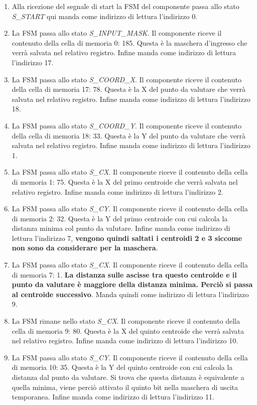 \documentclass{article}
\begin{document}
\begin{enumerate}
    \item Alla ricezione del segnale di start la FSM del componente passa allo stato \textit{S\_START} qui manda come indirizzo di lettura l'indirizzo 0.
    \item La FSM passa allo stato \textit{S\_INPUT\_MASK}. Il componente riceve il contenuto della cella di memoria 0: 185. Questa è la maschera d'ingresso che verrà salvata nel relativo registro. Infine manda come indirizzo di lettura l'indirizzo 17.
    \item La FSM passa allo stato \textit{S\_COORD\_X}. Il componente riceve il contenuto della cella di memoria 17: 78. Questa è la X del punto da valutare che verrà salvata nel relativo registro. Infine manda come indirizzo di lettura l'indirizzo 18.
    \item La FSM passa allo stato \textit{S\_COORD\_Y}. Il componente riceve il contenuto della cella di memoria 18: 33. Questa è la Y del punto da valutare che verrà salvata nel relativo registro. Infine manda come indirizzo di lettura l'indirizzo 1.
    \item La FSM passa allo stato \textit{S\_CX}. Il componente riceve il contenuto della cella di memoria 1: 75. Questa è la X del primo centroide che verrà salvata nel relativo registro. Infine manda come indirizzo di lettura l'indirizzo 2.
    \item La FSM passa allo stato \textit{S\_CY}. Il componente riceve il contenuto della cella di memoria 2: 32. Questa è la Y del primo centroide con cui calcola la distanza minima col punto da valutare. Infine manda come indirizzo di lettura l'indirizzo 7, \textbf{vengono quindi saltati i centroidi 2 e 3 siccome non sono da considerare per la maschera}.
    \item La FSM passa allo stato \textit{S\_CX}. Il componente riceve il contenuto della cella di memoria 7: 1. \textbf{La distanza sulle ascisse tra questo centroide e il punto da valutare è maggiore della distanza minima. Perciò si passa al centroide successivo}. Manda quindi come indirizzo di lettura l'indirizzo 9.
    \item La FSM rimane nello stato \textit{S\_CX}. Il componente riceve il contenuto della cella di memoria 9: 80. Questa è la X del quinto centroide che verrà salvata nel relativo registro. Infine manda come indirizzo di lettura l'indirizzo 10.
    \item La FSM passa allo stato \textit{S\_CY}. Il componente riceve il contenuto della cella di memoria 10: 35. Questa è la Y del quinto centroide con cui calcola la distanza dal punto da valutare. Si trova che questa distanza è equivalente a quella minima, viene perciò attivato il quinto bit nella maschera di uscita temporanea. Infine manda come indirizzo di lettura l'indirizzo 11.

\end{enumerate}
\end{document}
